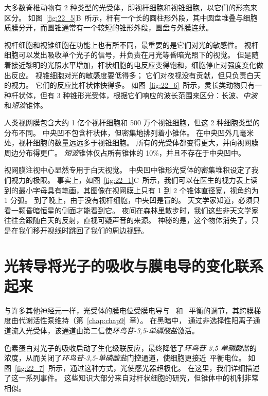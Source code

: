 大多数脊椎动物有 2 种类型的光受体，即视杆细胞和视锥细胞，以它们的形态来区分。
如图~\ref{fig:22_5}B~所示，杆有一个长的圆柱形外段，其中圆盘堆叠与细胞质膜分开，而圆锥通常有一个较短的锥形外段，圆盘与外膜连续。


视杆细胞和视锥细胞在功能上也有所不同，最重要的是它们对光的敏感性。
视杆细胞可以发出吸收单个光子的信号，并负责在月光等昏暗光照下的视觉。
但是随着接近黎明的光照水平增加，杆状细胞的电反应变得饱和，细胞停止对强度变化做出反应。 
视锥细胞对光的敏感度要低得多；
它们对夜视没有贡献，但只负责白天的视力。
它们的反应比杆状体快得多。
如图~\ref{fig:22_6}~所示，灵长类动物只有一种杆状体，但有 3 种锥形光受体，根据它们响应的波长范围来区分：长波、\textit{中波}和\textit{短波}锥体。


人类视网膜包含大约 1 亿个视杆细胞和 500 万个视锥细胞，但这 2 种细胞类型的分布不同。
中央凹不包含杆状体，但密集地排列着小锥体。
在中央凹外几毫米处，视杆细胞的数量远远多于视锥细胞。
所有的光受体都变得更大，并向视网膜周边分布得更广。
\textit{短波}锥体仅占所有锥体的 10\%，并且不存在于中央凹中。


视网膜注视中心显然专用于白天视觉。
中央凹中锥形光受体的密集堆积设定了我们视力的极限。
事实上，如图~\ref{fig:22_1}C~所示，我们可以在医生的视力表上读到的最小字母具有笔画，其图像在视网膜上只有 1 到 2 个锥体直径宽，视角约为 1 分弧。
到了晚上，由于没有视杆细胞，中央凹是盲的。
天文学家知道，必须只看一颗昏暗恒星的侧面才能看到它。
夜间在森林里散步时，我们这些非天文学家往往会跟随白天的反射，直视可疑声音的来源。 
神秘的是，这个物体消失了，只是在我们移开视线时跳回了我们的周边视野。



\section{光转导将光子的吸收与膜电导的变化联系起来}

与许多其他神经元一样，光受体的膜电位受膜电导与~ 和~ 平衡的调节，其跨膜梯度由代谢活性泵维持（第~\ref{chap:chap9}~章）。
在黑暗中， 通过非选择性阳离子通道流入光受体，该通道由第二信使\textit{环鸟苷-3,5-单磷酸盐}激活。


色素蛋白对光子的吸收启动了生化级联反应，最终降低了\textit{环鸟苷-3,5-单磷酸盐}的浓度，从而关闭了\textit{环鸟苷-3,5-单磷酸盐}门控通道，使细胞更接近~平衡电位。
如图~\ref{fig:22_7}~所示，通过这种方式，光使感光器超极化。
在这里，我们详细描述了这一系列事件。
这些知识大部分来自对杆状细胞的研究，但锥体中的机制非常相似。


